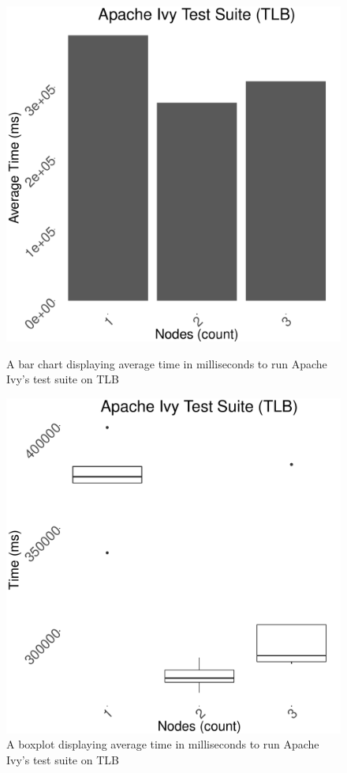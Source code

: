 \documentclass{article}
\begin{document}
{\begin{figure}[!ht]
  \centering
  \begin{minipage}[b]{0.4\textwidth}
    \includegraphics[width=\textwidth]{../data/graphs/ivy_bar_tlb.pdf}
    \caption{A bar chart displaying average time in milliseconds to run Apache Ivy's test suite on TLB}
    \label{ivybar}
  \end{minipage}
  \hfill
  \begin{minipage}[b]{0.4\textwidth}
    \includegraphics[width=\textwidth]{../data/graphs/ivy_boxplot_tlb.pdf}
    \caption{A boxplot displaying average time in milliseconds to run Apache Ivy's test suite on TLB}
    \label{ivybox}
  \end{minipage}
\end{figure}

}
\end{document}
